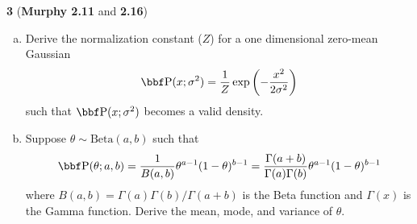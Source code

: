 \documentclass[12pt,letterpaper,fleqn]{hmcpset}
\begin{document}
\newpage

\textbf{3} (\textbf{Murphy 2.11} and \textbf{2.16})
\begin{enumerate}[(a)]
    \item Derive the normalization constant ($Z$) for a one dimensional
        zero-mean Gaussian
        \[
            \PP(x; \sigma^2) = \frac{1}{Z}\exp\left(-\frac{x^2}{2\sigma^2}\right)
        \]
        such that $\PP(x; \sigma^2)$ becomes a valid density.
    \item Suppose $\theta \sim \text{Beta}(a,b)$ such
        that
        \[
            \PP(\theta; a,b) = \frac{1}{B(a,b)} \theta^{a-1}(1-\theta)^{b-1} = \frac{\Gamma(a+b)}{\Gamma(a)\Gamma(b)} \theta^{a-1}(1-\theta)^{b-1}
        \]
        where $B(a,b) = \Gamma(a)\Gamma(b)/\Gamma(a+b)$ is the Beta function
        and $\Gamma(x)$ is the Gamma function.
        Derive the mean, mode, and variance of $\theta$.
\end{enumerate}
\end{document}

